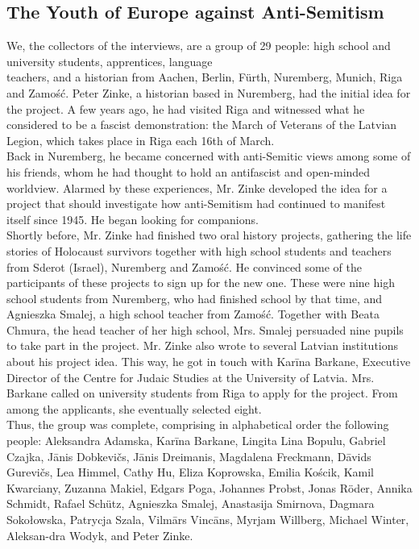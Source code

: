 \subsection*{The Youth of Europe against Anti-Semitism} 
We, the collectors of the interviews, are a group of 29 people: high school and university students, apprentices, language \\
teachers, and a historian from Aachen, Berlin, Fürth, Nuremberg, Munich, Riga and Zamość. Peter Zinke, a historian based in Nuremberg, had the initial idea for the project. A few years ago, he had visited Riga and witnessed what he considered to be a fascist demonstration: the March of Veterans of the Latvian Legion, which takes place in Riga each 16th of March. \\
Back in Nuremberg, he became concerned with anti-Semitic views among some of his friends, whom he had thought to hold an antifascist and open-minded worldview. Alarmed by these experiences, Mr. Zinke developed the idea for a project that should investigate how anti-Semitism had continued to manifest itself since 1945. He began looking for companions. \\
Shortly before, Mr. Zinke had finished two oral history projects, gathering the life stories of Holocaust survivors together with high school students and teachers from Sderot (Israel), Nuremberg and Zamość. He convinced some of the participants of these projects to sign up for the new one. These were nine high school students from Nuremberg, who had finished school by that time, and Agnieszka Smalej, a high school teacher from Zamość. Together with Beata Chmura, the head teacher of her high school, Mrs. Smalej persuaded nine pupils to take part in the project. Mr. Zinke also wrote to several Latvian institutions about his project idea. This way, he got in touch with Karīna Barkane, Executive Director of the Centre for Judaic Studies at the University of Latvia. Mrs. Barkane called on university students from Riga to apply for the project. From among the applicants, she eventually selected eight.\\
Thus, the group was complete, comprising in alphabetical order the following people: Aleksandra Adamska, Karīna Barkane, Lingita Lina Bopulu, Gabriel Czajka, Jānis Dobkevičs, Jānis Dreimanis, Magdalena Freckmann, Dāvids Gurevičs, Lea Himmel, Cathy Hu, Eliza Koprowska, Emilia Kościk, Kamil Kwarciany, Zuzanna Makiel, Edgars Poga, Johannes Probst, Jonas Röder, Annika Schmidt, Rafael Schütz, Agnieszka Smalej, Anastasija Smirnova, Dagmara Sokołowska, Patrycja Szala, Vilmārs Vincāns, Myrjam Willberg, Michael Winter, Aleksan-dra Wodyk, and Peter Zinke. \\
